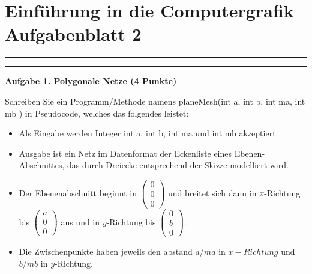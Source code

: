 \documentclass[a4paper,12pt]{scrartcl}
\begin{document}




\section*{\large Einf\"uhrung in die Computergrafik \\\vspace*{5mm}
                  \normalsize  Aufgabenblatt 2 }
\hrule
\hrule
\vspace{4mm}

{\bf Aufgabe 1. Polygonale Netze \hfill (4 Punkte)}

Schreiben Sie ein Programm/Methode  namens planeMesh(int a, int b, int ma, int mb ) in Pseudocode, welches  das folgendes leistet:
\begin{itemize}
\item Als Eingabe werden Integer  int a, int b, int  ma und int mb akzeptiert.
\item Ausgabe ist ein Netz im Datenformat der Eckenliste eines Ebenen-Abschnittes, das durch Dreiecke entsprechend der Skizze modelliert wird.
\item Der Ebenenabschnitt beginnt in $\begin{pmatrix} 0 \\ 0 \\ 0\end{pmatrix}$ und breitet sich dann in $x$-Richtung bis $\begin{pmatrix} a \\ 0 \\ 0\end{pmatrix}$ aus und in  $y$-Richtung bis $\begin{pmatrix} 0 \\ b \\ 0\end{pmatrix}$. 
\item Die Zwischenpunkte haben jeweils den abstand $a/ma$ in $x-Richtung$ und $b/mb$ in $y$-Richtung.
 \end{itemize}
\end{document}
